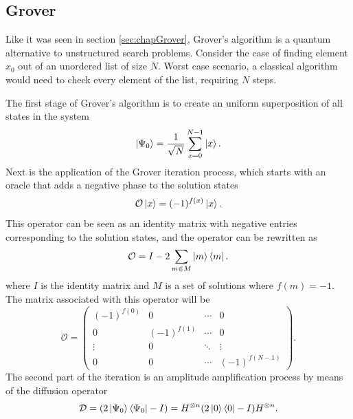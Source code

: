 \documentclass[../../dissertation.tex]{subfiles}
\begin{document}
\subsection{Grover}
Like it was seen in section \ref{sec:chapGrover}, Grover's algorithm is a quantum alternative to unstructured search problems. Consider the case of finding element $x_0$ out of an unordered list of size $N$. Worst case scenario, a classical algorithm would need to check every element of the list, requiring $N$ steps.\par
The first stage of Grover's algorithm is to create an uniform superposition of all states in the system
\begin{equation}
	\ket{\Psi_0}  = \frac{1}{\sqrt{N}}\sum_{x=0}^{N-1} \ket{x}.
\end{equation}
Next is the application of the Grover iteration process, which starts with an oracle that adds a negative phase to the solution states
\begin{equation}
        \mathcal{O}\ket{x} = (-1)^{f(x)}\ket{x}.
\end{equation}
This operator can be seen as an identity matrix with negative entries corresponding to the solution states, and the operator can be rewritten as 
\begin{equation}
	\mathcal{O} = I - 2\sum_{m\in M} \ket{m}\bra{m}.
	\label{eq:groverQiskitOracle}
\end{equation}
where $I$ is the identity matrix and $M$ is a set of solutions where $f(m) = -1$. The matrix associated with this operator will be
\begin{equation}
	\mathcal{O} = 
	\begin{pmatrix}
		(-1)^{f(0)} & 0 & \cdots & 0\\
	        0 & (-1)^{f(1)} & \cdots & 0\\ 
	        \vdots & 0 &  \ddots & \vdots\\ 
		0 & 0 & \cdots &  (-1)^{f(N-1)}
	\end{pmatrix}.
	\label{eq:oracleMatrixQiskit}
\end{equation}
The second part of the iteration is an amplitude amplification process by means of the diffusion operator 
\begin{equation}
        \mathcal{D} = (2\ket{\Psi_0}\bra{\Psi_0} - I) = H^{\otimes n}(2\ket{0}\bra{0} - I)H^{\otimes n}.
	\label{eq:groverQiskitDiffusion}
\end{equation}
\end{document}
